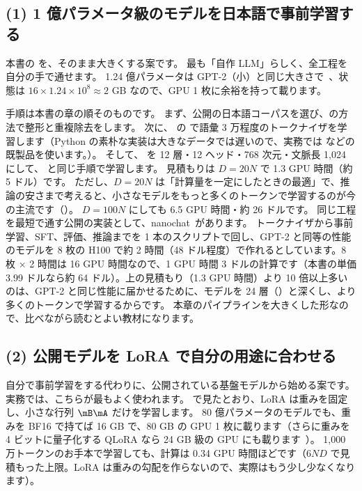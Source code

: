 \subsection*{(1) 1 億パラメータ級のモデルを日本語で事前学習する}

本書の  を、そのまま大きくする案です。
最も「自作 LLM」らしく、全工程を自分の手で通せます。
1.24 億パラメータは GPT-2（小）と同じ大きさで~\cite{radford2019language}、状態は $16 \times 1.24\times10^{8} \approx 2$ GB なので、GPU 1 枚に余裕を持って載ります。

手順は本書の章の順そのものです。
まず、公開の日本語コーパスを選び、の方法で整形と重複除去をします。
次に、 の  で語彙 3 万程度のトークナイザを学習します（Python の素朴な実装は大きなデータでは遅いので、実務では  などの既製品を使います。）。
そして、 を 12 層・12 ヘッド・768 次元・文脈長 1,024 にして、 と同じ手順で学習します。
見積もりは $D=20N$ で 1.3 GPU 時間（約 5 ドル）です。
ただし、$D=20N$ は「計算量を一定にしたときの最適」で、推論の安さまで考えると、小さなモデルをもっと多くのトークンで学習するのが今の主流です（）。
$D=100N$ にしても 6.5 GPU 時間・約 26 ドルです。
同じ工程を最短で通す公開の実装として、nanochat~\cite{karpathy2025nanochat}があります。
トークナイザから事前学習、SFT、評価、推論までを 1 本のスクリプトで回し、GPT-2 と同等の性能のモデルを 8 枚の H100 で約 2 時間（48 ドル程度）で作れるとしています。8 枚 × 2 時間は 16 GPU 時間なので、1 GPU 時間 3 ドルの計算です（本書の単価 3.99 ドルなら約 64 ドル）。上の見積もり（1.3 GPU 時間）より 10 倍以上多いのは、GPT-2 と同じ性能に届かせるために、モデルを 24 層（）と深くし、より多くのトークンで学習するからです。
本章のパイプラインを大きくした形なので、比べながら読むとよい教材になります。

\subsection*{(2) 公開モデルを LoRA で自分の用途に合わせる}

自分で事前学習をする代わりに、公開されている基盤モデルから始める案です。
実務では、こちらが最もよく使われます。
で見たとおり、LoRA は重みを固定し、小さな行列 $\mB\mA$ だけを学習します。
80 億パラメータのモデルでも、重みを BF16 で持てば 16 GB で、80 GB の GPU 1 枚に載ります（さらに重みを 4 ビットに量子化する QLoRA なら 24 GB 級の GPU にも載ります~\cite{dettmers2023qlora}）。
1,000 万トークンのお手本で学習しても、計算は 0.34 GPU 時間ほどです（$6ND$ で見積もった上限。LoRA は重みの勾配を作らないので、実際はもう少し少なくなります）。

